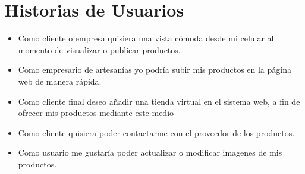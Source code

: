 \chapter{Historias de Usuarios}
\begin{itemize}
\item Como cliente o empresa quisiera una vista cómoda desde mi celular al momento de visualizar o publicar productos.
\item Como empresario de artesanías yo podría subir mis productos en la página web de manera rápida.
\item Como cliente final deseo añadir una tienda virtual en el sistema web, a fin de ofrecer mis productos mediante este medio
\item Como cliente quisiera poder contactarme con el proveedor de los productos.
\item Como usuario me gustaría poder actualizar o modificar imagenes de mis productos.
\end{itemize}